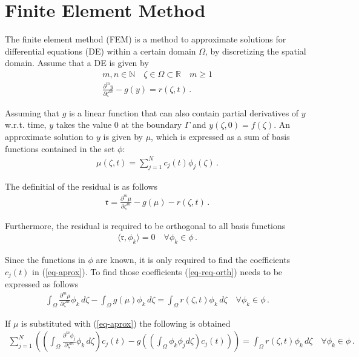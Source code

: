 \section{Finite Element Method} \label{FEM}
The finite element method (FEM) is a method to approximate solutions for differential equations (DE) within a certain domain \(\Omega\), by discretizing the spatial domain.
Assume that a DE is given by
\begin{gather}
m, n \in \mathbb{N} \quad \zeta \in \Omega \subset \mathbb{R} \quad m \geq 1 \\
\frac{\partial^{m} y}{\partial \zeta^{m}} -  g(y) = r(\zeta, t) \,. \label{eq-pde-gen} 
\end{gather}

Assuming that \(g\) is a linear function that can also contain partial derivatives of \(y\) w.r.t. time, \(y\) takes the value 0 at the boundary \(\Gamma\) and \(y(\zeta, 0) = f(\zeta)\).
An approximate solution to \(y\) is given by \(\mu\), which is expressed as a sum of basis functions contained in the set \(\phi\):
\begin{gather}
\mu(\zeta, t) = \sum_{j = 1}^{N} c_{j}(t)\phi_{j}(\zeta) \,. \label{eq-aprox}
\end{gather}

The definitial of the residual is as follows
\begin{gather}
\mathfrak{r} = \frac{\partial^{m} \mu}{\partial \zeta^{m}} -  g(\mu) - r(\zeta, t) \,.
\end{gather}

Furthermore, the residual is required to be orthogonal to all basis functions
\begin{gather}
\langle \mathfrak{r}, \phi_{k} \rangle = 0 \quad \forall \phi_{k} \in \phi \,. \label{eq-req-orth}
\end{gather}

Since the functions in \(\phi\) are known, it is only required to find the coefficients \(c_{j}(t)\) in (\ref{eq-aprox}).
To find those coefficients (\ref{eq-req-orth}) needs to be expressed as follows
\begin{gather}
\int_{\Omega} \frac{\partial^{m} \mu}{\partial \zeta^{m}} \phi_{k} \, d\zeta  -  \int_{\Omega} g(\mu) \phi_{k}        \, d\zeta = \int_{\Omega}  r(\zeta, t) \phi_{k}        \, d\zeta \quad \forall \phi_{k} \in \phi \,. 
\end{gather}

If \(\mu\) is substituted with (\ref{eq-aprox}) the following is obtained
\begin{gather}
\sum_{j = 1}^{N} \left( \left( \int_{\Omega} \frac{\partial^{m} \phi_{j}}{\partial \zeta^{m}} \phi_{k} \, d\zeta\right) c_{j}(t) - g\left( \left(\int_{\Omega} \phi_k \phi_j d\zeta\right) c_{j}(t)\right) \right)  = \int_{\Omega}  r(\zeta, t) \phi_{k}        \, d\zeta \quad \forall \phi_{k} \in \phi \,. \label{eq-al}
\end{gather}

